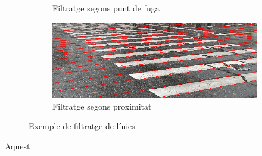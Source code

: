 \documentclass[10pt,a4paper,twocolumn,twoside]{article}
\begin{document}
\begin{figure}[!h]
\begin{subfigure}{0.45\columnwidth}
		\caption{Filtratge segons punt de fuga}
	\end{subfigure}
	\quad
	\begin{subfigure}{0.45\columnwidth}
		\includegraphics[width=\linewidth]{figs/filtrat_proximitat}
		\caption{Filtratge segons proximitat}
	\end{subfigure}
	\caption{Exemple de filtratge de línies}
	\label{fig:vores}
\end{figure}

Aquest




\end{document}
